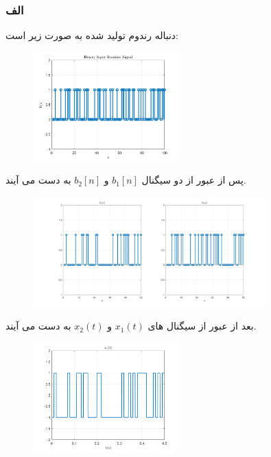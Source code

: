 \documentclass[a4paper]{article}
\begin{document}
\subsubsection*{الف}
دنباله رندوم تولید شده به صورت زیر است:
\begin{figure}[h!]
	\includegraphics[width=0.5\textwidth]{comsys_fig03.png}\\ 
	\centering
\end{figure}
\newline
پس از عبور از  دو سیگنال 
$b_1[n]$
و
$b_2[n]$
به دست می آیند.
\newline
\begin{figure}[h!]
	\includegraphics[width=0.8\textwidth]{comsys_fig04.png}\\ 
	\centering
\end{figure}
\newline
بعد از عبور از  سیگنال های 
$x_1(t)$
و 
$x_2(t)$
به دست می آیند.
\newline
\begin{figure}[h!]
	\includegraphics[width=0.5\textwidth]{comsys_fig05.png}\\ 
	\centering
\end{figure}
\end{document}
